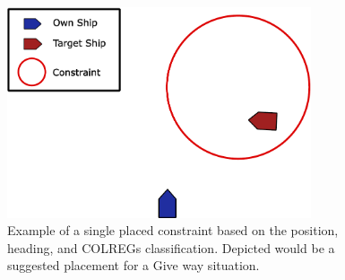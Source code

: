\begin{figure}[ht]
    \centering
    \includegraphics[width=0.8\textwidth]{Images/Constraint_Example.pdf}
    \caption{Example of a single placed constraint based on the position, heading, and COLREGs classification. Depicted would be a suggested
    placement for a Give way situation.}
    \label{FIG: Dynamic Constraint Example}
\end{figure}




